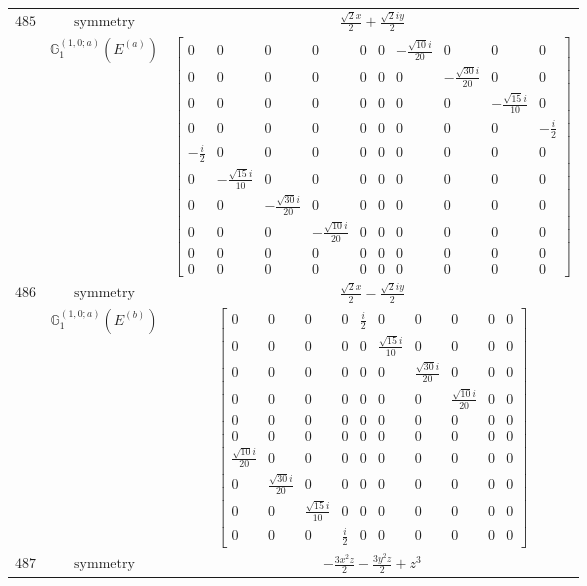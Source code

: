 \documentclass[fleqn,8pt,landscape]{jsarticle}
\begin{document}
\begin{longtable}{ccc}
$ 485 $ & $ \text{symmetry} $ & $ \frac{\sqrt{2} x}{2} + \frac{\sqrt{2} i y}{2} $ \\
$  $ & $ \mathbb{G}_{1}^{(1,0;a)}(E^{(a)}) $ & $ \begin{bmatrix} 0 & 0 & 0 & 0 & 0 & 0 & - \frac{\sqrt{10} i}{20} & 0 & 0 & 0 \\ 0 & 0 & 0 & 0 & 0 & 0 & 0 & - \frac{\sqrt{30} i}{20} & 0 & 0 \\ 0 & 0 & 0 & 0 & 0 & 0 & 0 & 0 & - \frac{\sqrt{15} i}{10} & 0 \\ 0 & 0 & 0 & 0 & 0 & 0 & 0 & 0 & 0 & - \frac{i}{2} \\ - \frac{i}{2} & 0 & 0 & 0 & 0 & 0 & 0 & 0 & 0 & 0 \\ 0 & - \frac{\sqrt{15} i}{10} & 0 & 0 & 0 & 0 & 0 & 0 & 0 & 0 \\ 0 & 0 & - \frac{\sqrt{30} i}{20} & 0 & 0 & 0 & 0 & 0 & 0 & 0 \\ 0 & 0 & 0 & - \frac{\sqrt{10} i}{20} & 0 & 0 & 0 & 0 & 0 & 0 \\ 0 & 0 & 0 & 0 & 0 & 0 & 0 & 0 & 0 & 0 \\ 0 & 0 & 0 & 0 & 0 & 0 & 0 & 0 & 0 & 0 \end{bmatrix} $ \\ \hline
$ 486 $ & $ \text{symmetry} $ & $ \frac{\sqrt{2} x}{2} - \frac{\sqrt{2} i y}{2} $ \\
$  $ & $ \mathbb{G}_{1}^{(1,0;a)}(E^{(b)}) $ & $ \begin{bmatrix} 0 & 0 & 0 & 0 & \frac{i}{2} & 0 & 0 & 0 & 0 & 0 \\ 0 & 0 & 0 & 0 & 0 & \frac{\sqrt{15} i}{10} & 0 & 0 & 0 & 0 \\ 0 & 0 & 0 & 0 & 0 & 0 & \frac{\sqrt{30} i}{20} & 0 & 0 & 0 \\ 0 & 0 & 0 & 0 & 0 & 0 & 0 & \frac{\sqrt{10} i}{20} & 0 & 0 \\ 0 & 0 & 0 & 0 & 0 & 0 & 0 & 0 & 0 & 0 \\ 0 & 0 & 0 & 0 & 0 & 0 & 0 & 0 & 0 & 0 \\ \frac{\sqrt{10} i}{20} & 0 & 0 & 0 & 0 & 0 & 0 & 0 & 0 & 0 \\ 0 & \frac{\sqrt{30} i}{20} & 0 & 0 & 0 & 0 & 0 & 0 & 0 & 0 \\ 0 & 0 & \frac{\sqrt{15} i}{10} & 0 & 0 & 0 & 0 & 0 & 0 & 0 \\ 0 & 0 & 0 & \frac{i}{2} & 0 & 0 & 0 & 0 & 0 & 0 \end{bmatrix} $ \\ \hline
$ 487 $ & $ \text{symmetry} $ & $ - \frac{3 x^{2} z}{2} - \frac{3 y^{2} z}{2} + z^{3} $ \\

\end{longtable}
\end{document}
